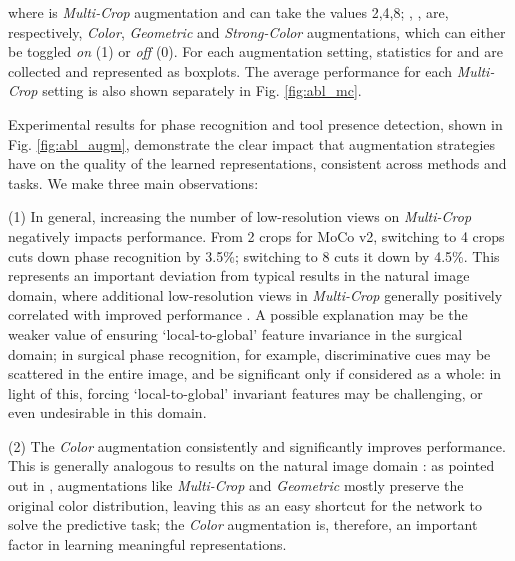 \documentclass[times,twocolumn,final]{elsarticle}
\begin{document}
\noindent where  is \textit{Multi-Crop} augmentation and can take the values 2,4,8; , ,  are, respectively, \textit{Color}, \textit{Geometric} and \textit{Strong-Color} augmentations, which can either be toggled \textit{on} (1) or \textit{off} (0).
For each augmentation setting, statistics for  and  are collected and represented as boxplots. The average performance for each \textit{Multi-Crop} setting is also shown separately in Fig. \ref{fig:abl_mc}.

Experimental results for phase recognition and tool presence detection, shown in Fig. \ref{fig:abl_augm}, demonstrate the clear impact that augmentation strategies have on the quality of the learned representations, consistent across methods and tasks. We make three main observations:

(1) In general, increasing the number of low-resolution views on \textit{Multi-Crop} negatively impacts performance. From 2 crops for MoCo v2, switching to 4 crops cuts down phase recognition  by 3.5\%; switching to 8 cuts it down by 4.5\%. This represents an important deviation from typical results in the natural image domain, where additional low-resolution views in \textit{Multi-Crop} generally positively correlated with improved performance \citep{caron2020unsupervised,caron2021emerging}. A possible explanation may be the weaker value of ensuring `local-to-global' feature invariance in the surgical domain; in surgical phase recognition, for example, discriminative cues may be scattered in the entire image, and be significant only if considered as a whole: in light of this, forcing `local-to-global' invariant features may be challenging, or even undesirable in this domain.

(2) The \textit{Color} augmentation consistently and significantly improves performance. This is generally analogous to results on the natural image domain \citep{feichtenhofer2021large}: as pointed out in \citep{chen2020simple}, augmentations like \textit{Multi-Crop} and \textit{Geometric} mostly preserve the original color distribution, leaving this as an easy shortcut for the network to solve the predictive task; the \textit{Color} augmentation is, therefore, an important factor in learning meaningful representations.
\end{document}
